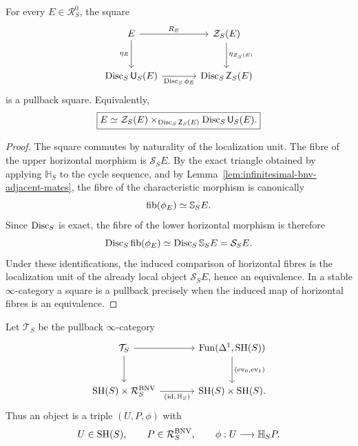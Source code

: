 \begin{theorem}
\label{thm:infinitesimal-bnv-reconstruction}
For every $E\in\mathcal R_S^0$, the square
\[
\begin{tikzcd}[column sep=large,row sep=large]
    E \ar[r,"R_E"] \ar[d,"\eta_E"']
        & \mathcal Z_S(E) \ar[d,"\eta_{\mathcal Z_S(E)}"]\\
    \Disc_S\mathsf U_S(E)
        \ar[r,"\Disc_S\phi_E"']
        & \Disc_S\mathsf Z_S(E)
\end{tikzcd}
\]
is a pullback square.  Equivalently,
\[
    \boxed{
    E
    \simeq
    \mathcal Z_S(E)
    \times_{\operatorname{Disc}_S\mathsf Z_S(E)}
    \operatorname{Disc}_S\mathsf U_S(E).
    }
\]
\end{theorem}

\begin{proof}
The square commutes by naturality of the localization unit.  The fibre of the
upper horizontal morphism is $\mathcal S_SE$.  By the exact triangle obtained
by applying $\mathbb H_S$ to the cycle sequence, and by
Lemma~\ref{lem:infinitesimal-bnv-adjacent-mates}, the fibre of the
characteristic morphism is canonically
\[
    \operatorname{fib}(\phi_E)\simeq\mathbb S_SE.
\]
Since $\operatorname{Disc}_S$ is exact, the fibre of the lower horizontal morphism is
therefore
\[
    \operatorname{Disc}_S\operatorname{fib}(\phi_E)
    \simeq
    \operatorname{Disc}_S\mathbb S_SE
    =
    \mathcal S_SE.
\]
Under these identifications, the induced comparison of horizontal fibres is
the localization unit of the already local object $\mathcal S_SE$, hence an
equivalence.  In a stable $\infty$-category a square is a pullback precisely
when the induced map of horizontal fibres is an equivalence.
\end{proof}

\begin{definition}
\label{def:infinitesimal-bnv-characteristic-data}
Let $\mathcal T_S$ be the pullback $\infty$-category
\[
\begin{tikzcd}[column sep=large,row sep=large]
    \mathcal T_S \ar[r] \ar[d]
        & \Fun(\Delta^1,\SH(S))
          \ar[d,"{(\operatorname{ev}_0,\operatorname{ev}_1)}"]\\
    \SH(S)\times\mathcal R_S^{\mathrm{BNV}}
        \ar[r,"{(\id,\,\mathbb H_S)}"']
        & \SH(S)\times\SH(S).
\end{tikzcd}
\]
Thus an object is a triple $(U,P,\phi)$ with
\[
    U\in\mathrm{SH}(S),
    \qquad
    P\in\mathcal R_S^{\mathrm{BNV}},
    \qquad
    \phi:U\longrightarrow\mathbb H_SP.
\]
\end{definition}

